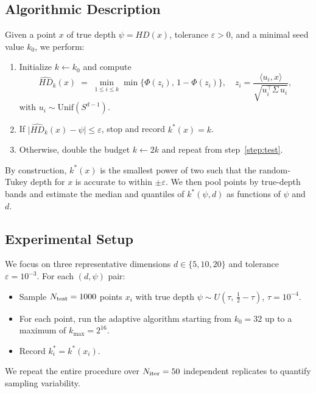 \documentclass[12pt]{report}
\begin{document}
\subsection{Algorithmic Description}
\label{ssec:adaptive-algo}

Given a point \(x\) of true depth \(\psi = HD(x)\), tolerance \(\varepsilon>0\), and a minimal seed value \(k_0\), we perform:

\begin{enumerate}
  \item Initialize \(k \leftarrow k_0\) and compute
    \[
      \widehat{HD}_k(x) \;=\;
      \min_{1\le i\le k} \min\{\Phi(z_i),\,1-\Phi(z_i)\},
      \quad
      z_i = \frac{\langle u_i, x\rangle}{\sqrt{u_i^\top \Sigma\,u_i}},
    \]
    with \(u_i\sim\mathrm{Unif}(S^{d-1})\).
  \item \label{step:test} If \(\bigl|\widehat{HD}_k(x) - \psi\bigr|\le \varepsilon\), stop and record \(k^*(x)=k\).  
  \item Otherwise, double the budget \(k\leftarrow 2k\) and repeat from step~\ref{step:test}.  
\end{enumerate}

By construction, \(k^*(x)\) is the smallest power of two such that the random‐Tukey depth for \(x\) is accurate to within \(\pm\varepsilon\).  We then pool points by true-depth bands and estimate the median and quantiles of \(k^*(\psi,d)\) as functions of \(\psi\) and \(d\).

\subsection{Experimental Setup}
\label{ssec:adaptive-setup}

We focus on three representative dimensions \(d\in\{5,10,20\}\) and tolerance \(\varepsilon=10^{-3}\).  For each \((d,\psi)\) pair:

\begin{itemize}
  \item Sample \(N_{\rm test}=1000\) points \(x_i\) with true depth \(\psi\sim U(\tau,\,\tfrac12-\tau)\), \(\tau=10^{-4}\).
  \item For each point, run the adaptive algorithm starting from \(k_0=32\) up to a maximum of \(k_{\max}=2^{16}\).
  \item Record \(k^*_i = k^*(x_i)\).  
\end{itemize}

We repeat the entire procedure over \(N_{\rm iter}=50\) independent replicates to quantify sampling variability.
\end{document}
